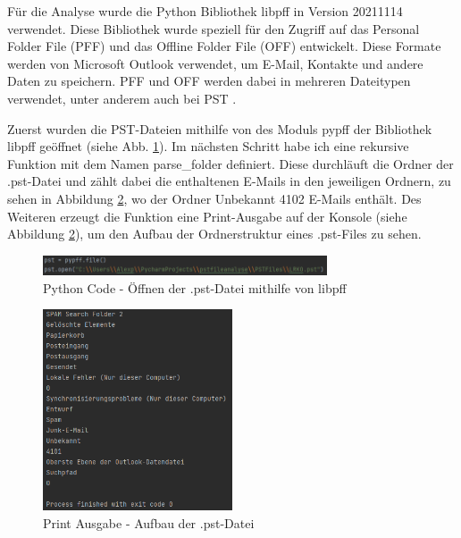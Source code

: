 \noindent Für die Analyse wurde die Python Bibliothek \glqq{}libpff\grqq{} in Version 20211114 verwendet. Diese Bibliothek wurde speziell für den Zugriff auf das Personal Folder File (PFF) und das Offline Folder File (OFF) entwickelt. Diese Formate werden von Microsoft Outlook verwendet, um E-Mail, Kontakte und andere Daten zu speichern. PFF und OFF werden dabei in mehreren Dateitypen verwendet, unter anderem auch bei PST \cite{GitHub.26.06.2022}. \smallskip

\noindent Zuerst wurden die PST-Dateien mithilfe von des Moduls pypff der Bibliothek libpff geöffnet (siehe Abb. \ref{fig:fileopen}). Im nächsten Schritt habe ich eine rekursive Funktion mit dem Namen parse\_folder definiert. Diese durchläuft die Ordner der .pst-Datei und zählt dabei die enthaltenen E-Mails in den jeweiligen Ordnern, zu sehen in Abbildung \ref{fig:pstfileaufbau}, wo der Ordner Unbekannt 4102 E-Mails enthält. Des Weiteren erzeugt die Funktion eine Print-Ausgabe auf der Konsole (siehe Abbildung \ref{fig:pstfileaufbau}), um den Aufbau der Ordnerstruktur eines .pst-Files zu sehen. \smallskip

\begin{figure}[!ht]
    \centering
    \includegraphics[width=0.75\textwidth]{images/File_open_libpff.PNG}
    \caption{Python Code - Öffnen der .pst-Datei mithilfe von libpff} 
    \label{fig:fileopen}
\end{figure}

\begin{figure}[!ht]
    \centering
    \includegraphics[width=0.50\textwidth]{images/PST_File_Aufbau_Python.png}
    \caption{Print Ausgabe - Aufbau der .pst-Datei} 
    \label{fig:pstfileaufbau}
\end{figure}


